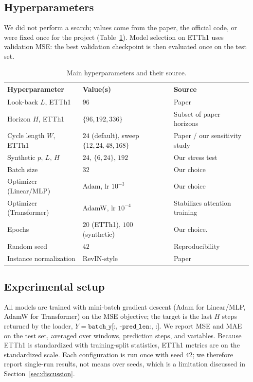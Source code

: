 \documentclass[10pt]{article}
\begin{document}
\subsection{Hyperparameters}

We did not perform a search; values come from the paper, the official code, or were fixed once for the project (Table~\ref{tab:hyperparameters}). Model selection on ETTh1 uses validation MSE: the best validation checkpoint is then evaluated once on the test set.

\begin{table}[h]
\centering
\caption{Main hyperparameters and their source.}
\label{tab:hyperparameters}
\begin{tabular}{lll}
\toprule
Hyperparameter & Value(s) & Source \\
\midrule
Look-back $L$, ETTh1 & $96$ & Paper \\
Horizon $H$, ETTh1 & $\{96,192,336\}$ & Subset of paper horizons \\
Cycle length $W$, ETTh1 & $24$ (default), sweep $\{12,24,48,168\}$ & Paper / our sensitivity study \\
Synthetic $p$, $L$, $H$ & $24$, $\{6,24\}$, $192$ & Our stress test \\
Batch size & $32$ & Our choice \\
Optimizer (Linear/MLP) & Adam, lr $10^{-3}$ & Our choice \\
Optimizer (Transformer) & AdamW, lr $10^{-4}$ & Stabilizes attention training \\
Epochs & $20$ (ETTh1), $100$ (synthetic) & Our choice. \\
Random seed & $42$ & Reproducibility \\
Instance normalization & RevIN-style & Paper \\
\bottomrule
\end{tabular}
\end{table}

\subsection{Experimental setup}

All models are trained with mini-batch gradient descent (Adam for Linear/MLP, AdamW for Transformer) on the MSE objective; the target is the last $H$ steps returned by the loader, $Y = \texttt{batch\_y[:, -pred\_len:, :]}$. We report MSE and MAE on the test set, averaged over windows, prediction steps, and variables. Because ETTh1 is standardized with training-split statistics, ETTh1 metrics are on the standardized scale. Each configuration is run once with seed $42$; we therefore report single-run results, not means over seeds, which is a limitation discussed in Section~\ref{sec:discussion}.
\end{document}
